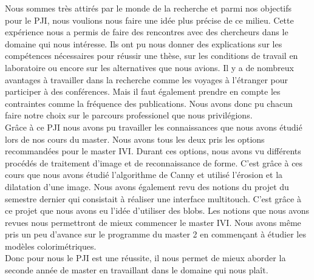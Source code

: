 Nous sommes très attirés par le monde de la recherche et parmi nos objectifs pour le PJI, nous voulions 
nous faire une idée plus précise de ce milieu. Cette expérience nous a permis de faire des rencontres
avec des chercheurs dans le domaine qui nous intéresse. Ils ont pu nous donner des explications
sur les compétences nécessaires pour réussir une thèse, sur les conditions de travail en laboratoire 
ou encore sur les alternatives que nous avions. Il y a de nombreux avantages à travailler dans la recherche
comme les voyages à l'étranger pour participer à des conférences. Mais il faut également prendre en compte les contraintes
comme la fréquence des publications. Nous avons donc pu chacun faire notre choix sur le parcours professionel
que nous privilégions.\\

Grâce à ce PJI nous avons pu travailler les connaissances que nous avons étudié lors de nos cours du master.
Nous avons tous les deux pris les options recommandées pour le master IVI. Durant ces options, nous avons 
vu différents procédés de traitement d'image et de reconnaissance de forme. C'est grâce à ces cours que nous
avons étudié l'algorithme de Canny et utilisé l'érosion et la dilatation d'une image. Nous avons également
revu des notions du projet du semestre dernier qui consistait à réaliser une interface multitouch. C'est grâce
à ce projet que nous avons eu l'idée d'utiliser des blobs.
Les notions que nous avons revues nous permettront de mieux commencer le master IVI. Nous avons même pris
un peu d'avance sur le programme du master 2 en commençant à étudier les modèles colorimétriques.\\

Donc pour nous le PJI est une réussite, il nous permet de mieux aborder la seconde année de master en travaillant 
dans le domaine qui nous plaît.
\newpage